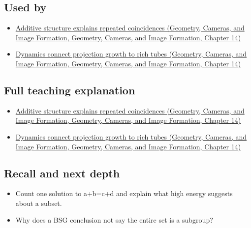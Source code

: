 \subsection{Used by}\label{appendix-b0732b22e7d6-used-by}

\begin{itemize}
\tightlist
\item
  \href{../03-Geometry-Cameras-and-Image-Formation/main.pdf\#nameddest=04-visual-computing-ii-ch033-additive-structure-explains-repeated-coincidences}{Additive structure explains repeated coincidences (Geometry, Cameras, and Image Formation, Geometry, Cameras, and Image Formation, Chapter 14)}
\item
  \href{../03-Geometry-Cameras-and-Image-Formation/main.pdf\#nameddest=04-visual-computing-ii-ch033-dynamics-connect-projection-growth-to-rich-tubes}{Dynamics connect projection growth to rich tubes (Geometry, Cameras, and Image Formation, Geometry, Cameras, and Image Formation, Chapter 14)}
\end{itemize}

\subsection{Full teaching explanation}\label{appendix-b0732b22e7d6-full-teaching-explanation}

\begin{itemize}
\tightlist
\item
  \href{../03-Geometry-Cameras-and-Image-Formation/main.pdf\#nameddest=04-visual-computing-ii-ch033-additive-structure-explains-repeated-coincidences}{Additive structure explains repeated coincidences (Geometry, Cameras, and Image Formation, Geometry, Cameras, and Image Formation, Chapter 14)}
\item
  \href{../03-Geometry-Cameras-and-Image-Formation/main.pdf\#nameddest=04-visual-computing-ii-ch033-dynamics-connect-projection-growth-to-rich-tubes}{Dynamics connect projection growth to rich tubes (Geometry, Cameras, and Image Formation, Geometry, Cameras, and Image Formation, Chapter 14)}
\end{itemize}

\subsection{Recall and next depth}\label{appendix-b0732b22e7d6-recall-and-next-depth}

\begin{itemize}
\tightlist
\item
  Count one solution to a+b=c+d and explain what high energy suggests about a subset.
\item
  Why does a BSG conclusion not say the entire set is a subgroup?
\end{itemize}

